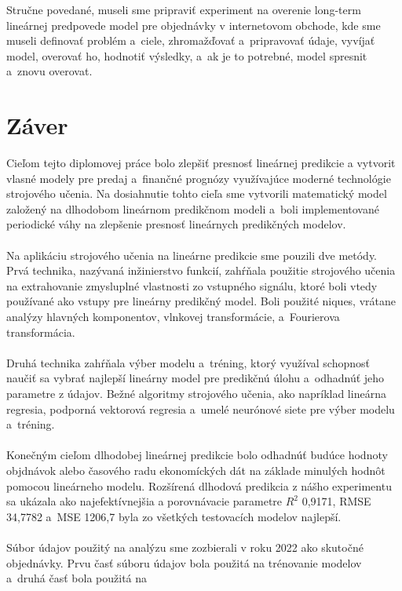     Stručne povedané, museli sme pripraviť experiment na overenie long-term lineárnej predpovede model pre objednávky v
    internetovom obchode, kde sme museli definovať problém a~ciele, zhromažďovať a~pripravovať údaje, vyvíjať model,
    overovať ho, hodnotiť výsledky, a~ak je to potrebné, model spresnit a~znovu overovat.

    \section{Záver}
    Cieľom tejto diplomovej práce bolo zlepšiť presnosť lineárnej predikcie
    a vytvorit vlasné modely pre predaj a~finančné prognózy využívajúce moderné technológie
    strojového učenia. Na dosiahnutie tohto cieľa sme vytvorili matematický model založený na dlhodobom lineárnom
    predikčnom modeli a~boli implementované periodické váhy na zlepšenie presnosť lineárnych predikčných modelov.\\
    \\
    Na aplikáciu strojového učenia na lineárne predikcie sme pouzili dve metódy. Prvá technika,
    nazývaná inžinierstvo funkcií, zahŕňala použitie strojového učenia na extrahovanie zmysluplné
    vlastnosti zo vstupného signálu, ktoré boli vtedy používané ako vstupy pre lineárny predikčný
    model. Boli použité niques, vrátane analýzy hlavných komponentov, vlnkovej transformácie,
    a~Fourierova transformácia.\\
    \\
    Druhá technika zahŕňala výber modelu a~tréning, ktorý využíval schopnosť
    naučiť sa vybrať najlepší lineárny model pre predikčnú úlohu a~odhadnúť jeho
    parametre z údajov. Bežné algoritmy strojového učenia, ako napríklad lineárna regresia,
    podporná vektorová regresia a~umelé neurónové siete pre výber modelu a~tréning.\\
    \\
    Konečným cieľom dlhodobej lineárnej predikcie bolo odhadnúť budúce hodnoty
    objdnávok alebo časového radu ekonomíckých dát na základe minulých hodnôt pomocou
    lineárneho modelu. Rozšírená dlhodová predikcia z nášho experimentu sa ukázala ako
    najefektívnejšia a porovnávacie parametre $R^2$ 0,9171, RMSE 34,7782 a~MSE 1206,7 byla zo všetkých
    testovacích modelov najlepší.\\
    \\
    Súbor údajov použitý na analýzu sme zozbierali v roku 2022 ako skutočné objednávky. Prvu
    časť súboru údajov bola použitá na trénovanie modelov a~druhá časť bola použitá na
